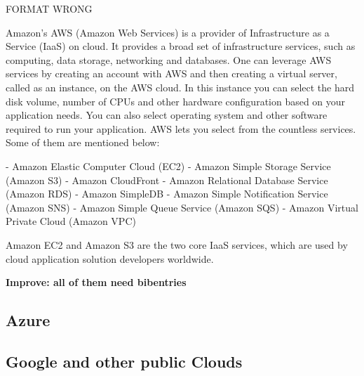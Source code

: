 {FORMAT WRONG

Amazon’s AWS (Amazon Web Services) is a provider of Infrastructure as
a Service (IaaS) on cloud. It provides a broad set of infrastructure
services, such as computing, data storage, networking and databases.
One can leverage AWS services by creating an account with AWS and then
creating a virtual server, called as an instance, on the AWS cloud.
In this instance you can select the hard disk volume, number of CPUs
and other hardware configuration based on your application needs.  You
can also select operating system and other software required to run
your application. AWS lets you select from the countless services.
Some of them are mentioned below:

     -  Amazon Elastic Computer Cloud (EC2)
     -  Amazon Simple Storage Service (Amazon S3)
     -  Amazon CloudFront
     -  Amazon Relational Database Service (Amazon RDS)
     -  Amazon SimpleDB
     -  Amazon Simple Notification Service (Amazon SNS)
     -  Amazon Simple Queue Service (Amazon SQS)
     -  Amazon Virtual Private Cloud (Amazon VPC)

     Amazon EC2 and Amazon S3 are the two core IaaS services, which
     are used by cloud application solution developers
     worldwide. \cite{www-aws}

     {\bf Improve: all of them need bibentries}
     
\subsection{Azure}
\subsection{Google and other public Clouds}

}
